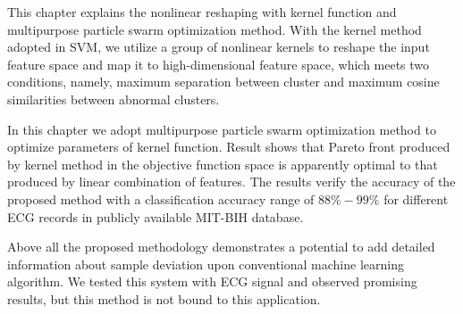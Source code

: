 This chapter explains the nonlinear reshaping with kernel function and multipurpose particle swarm optimization method. With the kernel method adopted in SVM, we utilize a group of nonlinear kernels to reshape the input feature space and map it to high-dimensional feature space, which meets two conditions, namely, maximum separation between cluster and maximum cosine similarities between abnormal clusters.

In this chapter we adopt multipurpose particle swarm optimization method to optimize parameters of kernel function. Result shows that Pareto front produced by kernel method in the objective function space is apparently optimal to that produced by linear combination of features. The results verify the accuracy of the proposed method with a classification accuracy range of $88\%-99\%$ for different ECG records in publicly available MIT-BIH database.

Above all the proposed methodology demonstrates a potential to add detailed information about sample deviation upon conventional machine learning algorithm. We tested this system with ECG signal and observed promising results, but this method is not bound to this application. 
  